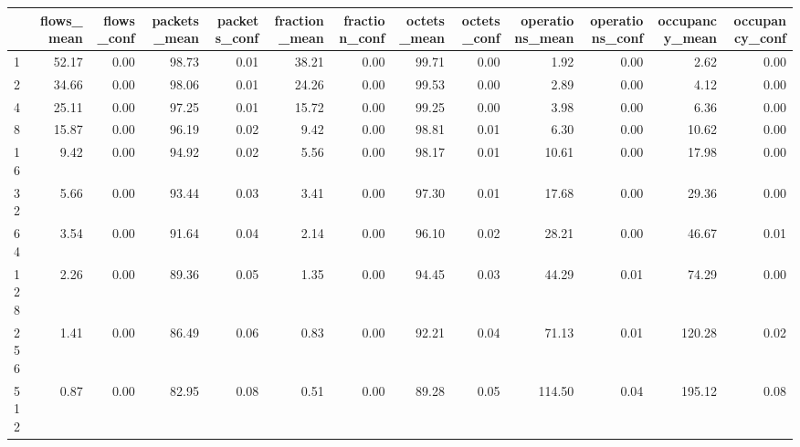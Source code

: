 \begin{tabular}{lrrrrrrrrrrrr}
\toprule
{} &  flows\_mean &  flows\_conf &  packets\_mean &  packets\_conf &  fraction\_mean &  fraction\_conf &  octets\_mean &  octets\_conf &  operations\_mean &  operations\_conf &  occupancy\_mean &  occupancy\_conf \\
\midrule
1        &       52.17 &        0.00 &         98.73 &          0.01 &          38.21 &           0.00 &        99.71 &         0.00 &             1.92 &             0.00 &            2.62 &            0.00 \\
2        &       34.66 &        0.00 &         98.06 &          0.01 &          24.26 &           0.00 &        99.53 &         0.00 &             2.89 &             0.00 &            4.12 &            0.00 \\
4        &       25.11 &        0.00 &         97.25 &          0.01 &          15.72 &           0.00 &        99.25 &         0.00 &             3.98 &             0.00 &            6.36 &            0.00 \\
8        &       15.87 &        0.00 &         96.19 &          0.02 &           9.42 &           0.00 &        98.81 &         0.01 &             6.30 &             0.00 &           10.62 &            0.00 \\
16       &        9.42 &        0.00 &         94.92 &          0.02 &           5.56 &           0.00 &        98.17 &         0.01 &            10.61 &             0.00 &           17.98 &            0.00 \\
32       &        5.66 &        0.00 &         93.44 &          0.03 &           3.41 &           0.00 &        97.30 &         0.01 &            17.68 &             0.00 &           29.36 &            0.00 \\
64       &        3.54 &        0.00 &         91.64 &          0.04 &           2.14 &           0.00 &        96.10 &         0.02 &            28.21 &             0.00 &           46.67 &            0.01 \\
128      &        2.26 &        0.00 &         89.36 &          0.05 &           1.35 &           0.00 &        94.45 &         0.03 &            44.29 &             0.01 &           74.29 &            0.00 \\
256      &        1.41 &        0.00 &         86.49 &          0.06 &           0.83 &           0.00 &        92.21 &         0.04 &            71.13 &             0.01 &          120.28 &            0.02 \\
512      &        0.87 &        0.00 &         82.95 &          0.08 &           0.51 &           0.00 &        89.28 &         0.05 &           114.50 &             0.04 &          195.12 &            0.08 \\

\end{tabular}
